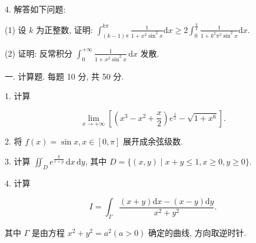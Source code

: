 \documentclass{examcollection}
\renewcommand{\displayformula}[1]{\[#1\]}
\begin{document}
{\begin{minipage}{\textwidth}
4. 解答如下问题:\par
(1) 设 $k$ 为正整数, 证明: $\int_{(k-1)\pi}^{k\pi} \frac{1}{1 + x^2 \sin^2 x} \mathrm{d}x \geq 2 \int_0^{\frac{\pi}{2}} \frac{1}{1 + k^2 \pi^2 \sin^2 x} \mathrm{d}x.$\par
(2) 证明: 反常积分 $\int_{0}^{+\infty} \frac{1}{1 + x^2 \sin^2 x} \, \mathrm{d}x$ 发散.\par
{}\smallskip
一. 计算题. 每题 10 分, 共 50 分.\par
1. 计算\par
\displayformula{\lim _ {x \rightarrow + \infty} \left[\left(x ^ {3} - x ^ {2} + \frac {x}{2}\right) e ^ {\frac {1}{x}} - \sqrt {1 + x ^ {6}} \right].}\par
2. 将 $f(x) = \sin x, x \in [0, \pi]$ 展开成余弦级数.\par
3. 计算 $\iint_{D} e^{\frac{y}{x + y}} \, \mathrm{d}x \, \mathrm{d}y$, 其中 $D = \{(x, y) \mid x + y \leq 1, x \geq 0, y \geq 0\}$.\par
4. 计算\par
\displayformula{I = \int_ {\Gamma} \frac {(x + y) \mathrm{d} x - (x - y) \mathrm{d} y}{x ^ {2} + y ^ {2}}.}\par
其中  $\Gamma$  是由方程  $x^{2} + y^{2} = a^{2} (a > 0)$  确定的曲线, 方向取逆时针.\par
\end{minipage}}
\ifdim\dimexpr\ht\proofbox+\dp\proofbox\relax>\textheight
\noindent\resizebox{!}{\textheight}{\usebox{\proofbox}}\else\noindent\usebox{\proofbox}\fi\clearpage
\end{document}
